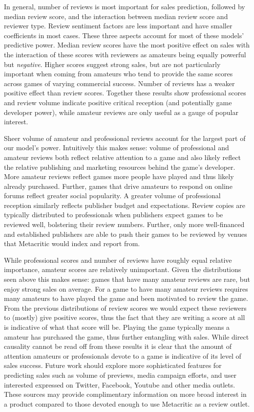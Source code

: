 \documentclass[letterpaper]{article}
\begin{document}
In general, number of reviews is most important for sales prediction, followed by median review score, and the interaction between median review score and reviewer type. Review sentiment factors are less important and have smaller coefficients in most cases. These three aspects account for most of these models' predictive power. Median review scores have the most positive effect on sales with the interaction of these scores with reviewers as amateurs being equally powerful but \textit{negative}. Higher scores suggest strong sales, but are not particularly important when coming from amateurs who tend to provide the same scores across games of varying commercial success. Number of reviews has a weaker positive effect than review scores. Together these results show professional scores and review volume indicate positive critical reception (and potentially game developer power), while amateur reviews are only useful as a gauge of popular interest.

Sheer volume of amateur and professional reviews account for the largest part of our model's power. Intuitively this makes sense: volume of professional and amateur reviews both reflect relative attention to a game and also likely reflect the relative publishing and marketing resources behind the game's developer. More amateur reviews reflect games more people have played and thus likely already purchased. Further, games that drive amateurs to respond on online forums reflect greater social popularity. A greater volume of professional reception similarly reflects publisher budget and expectations. Review copies are typically distributed to professionals when publishers expect games to be reviewed well, bolstering their review numbers. Further, only more well-financed and established publishers are able to push their games to be reviewed by venues that Metacritic would index and report from.

While professional scores and number of reviews have roughly equal relative importance, amateur scores are relatively unimportant. Given the distributions seen above this makes sense: games that have many amateur reviews are rare, but enjoy strong sales on average. For a game to have many amateur reviews requires many amateurs to have played the game and been motivated to review the game. From the previous distributions of review scores we would expect these reviewers to (mostly) give positive scores, thus the fact that they are writing a score at all is indicative of what that score will be. Playing the game typically means a amateur has purchased the game, thus further entangling with sales. While direct causality cannot be read off from these results it is clear that the amount of attention amateurs or professionals devote to a game is indicative of its level of sales success. Future work should explore more sophisticated features for predicting sales such as volume of previews, media campaign efforts, and user interested expressed on Twitter, Facebook, Youtube and other media outlets. These sources may provide complimentary information on more broad interest in a product compared to those devoted enough to use Metacritic as a review outlet.
\end{document}
